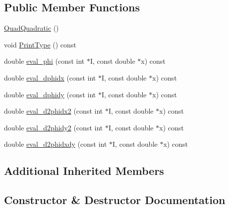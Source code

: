 \subsection*{Public Member Functions}
\begin{DoxyCompactItemize}
\item 
\mbox{\hyperlink{classfemus_1_1_quad_quadratic_a0ebae3ec61e002220d63d6d40e74468e}{Quad\+Quadratic}} ()
\item 
void \mbox{\hyperlink{classfemus_1_1_quad_quadratic_ab8a4e2a37b68850c536bffb8d2fddf3b}{Print\+Type}} () const
\item 
double \mbox{\hyperlink{classfemus_1_1_quad_quadratic_a940fc09cf194646fc5f3cc27c40760a1}{eval\+\_\+phi}} (const int $\ast$I, const double $\ast$x) const
\item 
double \mbox{\hyperlink{classfemus_1_1_quad_quadratic_ad8c70fc688c0ce5a9bac35437d8c09a8}{eval\+\_\+dphidx}} (const int $\ast$I, const double $\ast$x) const
\item 
double \mbox{\hyperlink{classfemus_1_1_quad_quadratic_a73c748c9cdef1636994ed7899b027601}{eval\+\_\+dphidy}} (const int $\ast$I, const double $\ast$x) const
\item 
double \mbox{\hyperlink{classfemus_1_1_quad_quadratic_abb3a37830ada326faacf6ff6f30f3fe9}{eval\+\_\+d2phidx2}} (const int $\ast$I, const double $\ast$x) const
\item 
double \mbox{\hyperlink{classfemus_1_1_quad_quadratic_a265d47435257f480aa10db30913d9780}{eval\+\_\+d2phidy2}} (const int $\ast$I, const double $\ast$x) const
\item 
double \mbox{\hyperlink{classfemus_1_1_quad_quadratic_a5f8d571d5684cb6f38087c4b3ba4f0b8}{eval\+\_\+d2phidxdy}} (const int $\ast$I, const double $\ast$x) const
\end{DoxyCompactItemize}
\subsection*{Additional Inherited Members}


\subsection{Constructor \& Destructor Documentation}
\mbox{\label{classfemus_1_1_quad_quadratic_a0ebae3ec61e002220d63d6d40e74468e}} 
